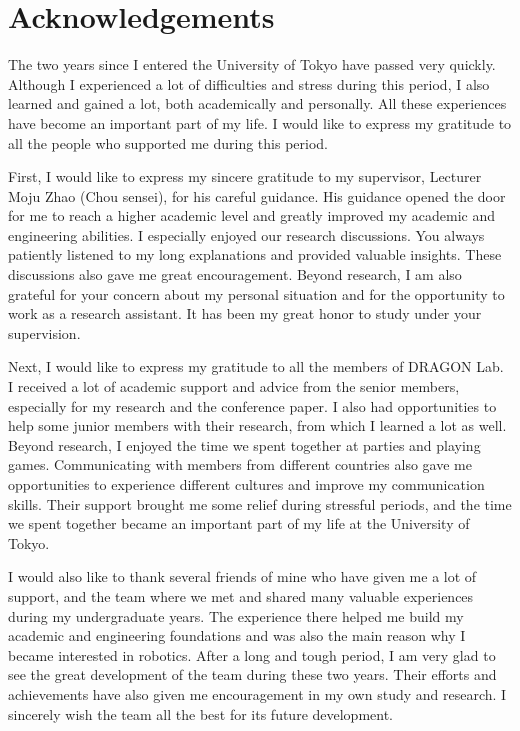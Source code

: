 \chapter*{Acknowledgements}

The two years since I entered the University of Tokyo have passed very quickly. Although I experienced a lot of difficulties and stress during this period, I also learned and gained a lot, both academically and personally. All these experiences have become an important part of my life. I would like to express my gratitude to all the people who supported me during this period.

First, I would like to express my sincere gratitude to my supervisor, Lecturer Moju Zhao (Chou sensei), for his careful guidance. His guidance opened the door for me to reach a higher academic level and greatly improved my academic and engineering abilities. I especially enjoyed our research discussions. You always patiently listened to my long explanations and provided valuable insights. These discussions also gave me great encouragement. Beyond research, I am also grateful for your concern about my personal situation and for the opportunity to work as a research assistant. It has been my great honor to study under your supervision.

Next, I would like to express my gratitude to all the members of DRAGON Lab. I received a lot of academic support and advice from the senior members, especially for my research and the conference paper. I also had opportunities to help some junior members with their research, from which I learned a lot as well. Beyond research, I enjoyed the time we spent together at parties and playing games. Communicating with members from different countries also gave me opportunities to experience different cultures and improve my communication skills. Their support brought me some relief during stressful periods, and the time we spent together became an important part of my life at the University of Tokyo.

I would also like to thank several friends of mine who have given me a lot of support, and the team where we met and shared many valuable experiences during my undergraduate years. The experience there helped me build my academic and engineering foundations and was also the main reason why I became interested in robotics. After a long and tough period, I am very glad to see the great development of the team during these two years. Their efforts and achievements have also given me encouragement in my own study and research. I sincerely wish the team all the best for its future development.


